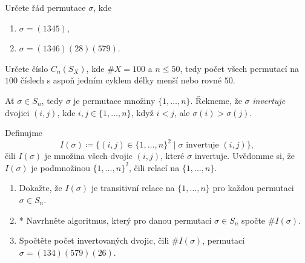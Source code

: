 \begin{exercise}
 Určete řád permutace $\sigma$, kde
 \begin{enumerate}[label=(\arabic*),topsep=0pt]
  \item $\sigma = (1345)$,
  \item $\sigma = (1346)(28)(579)$.
 \end{enumerate}
\end{exercise}

\begin{exercise}[těžké]
 Určete číslo $C_n(S_X)$, kde $\# X = 100$ a $n \leq 50$, tedy počet všech
 permutací na $100$ číslech s aspoň jedním cyklem délky menší nebo rovné
 $50$.
\end{exercise}

\begin{exercise}
 Ať $\sigma \in S_n$, tedy $\sigma$ je permutace množiny $\{1,\ldots,n\}$.
 Řekneme, že $\sigma$ \emph{invertuje} dvojici $(i,j)$, kde $i,j \in
 \{1,\ldots,n\}$, když $i<j$, ale $\sigma(i)>\sigma(j)$.

 Definujme
  \[
   I(\sigma) \coloneqq \{(i,j) \in \{1,\ldots,n\}^2 \mid \sigma \text{ invertuje
   } (i,j)\},
 \]
 čili $I(\sigma)$ je množina všech dvojic $(i,j)$, které $\sigma$ invertuje.
 Uvědomme si, že $I(\sigma)$ je podmnožinou $\{1,\ldots,n\}^2$, čili relací na
 $\{1,\ldots,n\}$.
 \begin{enumerate}[label=(\arabic*),topsep=0pt]
  \item Dokažte, že $I(\sigma)$ je transitivní relace na $\{1,\ldots,n\}$ pro
   každou permutaci $\sigma \in S_n$.
  \item* Navrhněte algoritmus, který pro danou permutaci $\sigma \in S_n$ spočte
   $\# I(\sigma)$.
  \item Spočtěte počet invertovaných dvojic, čili $\# I(\sigma)$, permutací
   $\sigma = (134)(579)(26)$.
 \end{enumerate}
\end{exercise}

